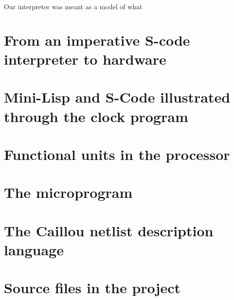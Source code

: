 \documentclass[a4paper, 11pt]{article}
\begin{document}
Our interpreter was meant as a model of what 

\section{From an imperative S-code interpreter to hardware}




\newpage
\appendix

\section{Mini-Lisp and S-Code illustrated through the clock program}


\section{Functional units in the processor}

\section{The microprogram}



\section{The Caillou netlist description language}

\section{Source files in the project}







\end{document}
